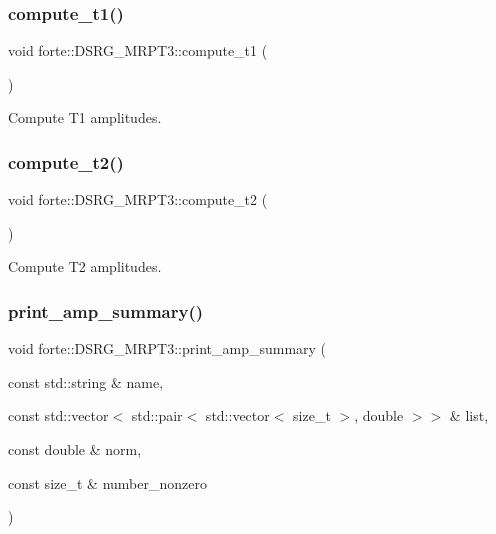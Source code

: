 \subsubsection{\texorpdfstring{compute\+\_\+t1()}{compute\_t1()}}
{\footnotesize\ttfamily void forte\+::\+D\+S\+R\+G\+\_\+\+M\+R\+P\+T3\+::compute\+\_\+t1 (\begin{DoxyParamCaption}{ }\end{DoxyParamCaption})\hspace{0.3cm}{\ttfamily [protected]}}



Compute T1 amplitudes. 

\mbox{\label{classforte_1_1_d_s_r_g___m_r_p_t3_a0358b0213517f969fda06fbcbe86ea94}} 
\subsubsection{\texorpdfstring{compute\+\_\+t2()}{compute\_t2()}}
{\footnotesize\ttfamily void forte\+::\+D\+S\+R\+G\+\_\+\+M\+R\+P\+T3\+::compute\+\_\+t2 (\begin{DoxyParamCaption}{ }\end{DoxyParamCaption})\hspace{0.3cm}{\ttfamily [protected]}}



Compute T2 amplitudes. 

\mbox{\label{classforte_1_1_d_s_r_g___m_r_p_t3_acc86f6e843feea90ab27a456ccdca039}} 
\subsubsection{\texorpdfstring{print\+\_\+amp\+\_\+summary()}{print\_amp\_summary()}}
{\footnotesize\ttfamily void forte\+::\+D\+S\+R\+G\+\_\+\+M\+R\+P\+T3\+::print\+\_\+amp\+\_\+summary (\begin{DoxyParamCaption}\item[{const std\+::string \&}]{name,  }\item[{const std\+::vector$<$ std\+::pair$<$ std\+::vector$<$ size\+\_\+t $>$, double $>$$>$ \&}]{list,  }\item[{const double \&}]{norm,  }\item[{const size\+\_\+t \&}]{number\+\_\+nonzero }\end{DoxyParamCaption})\hspace{0.3cm}{\ttfamily [protected]}}



